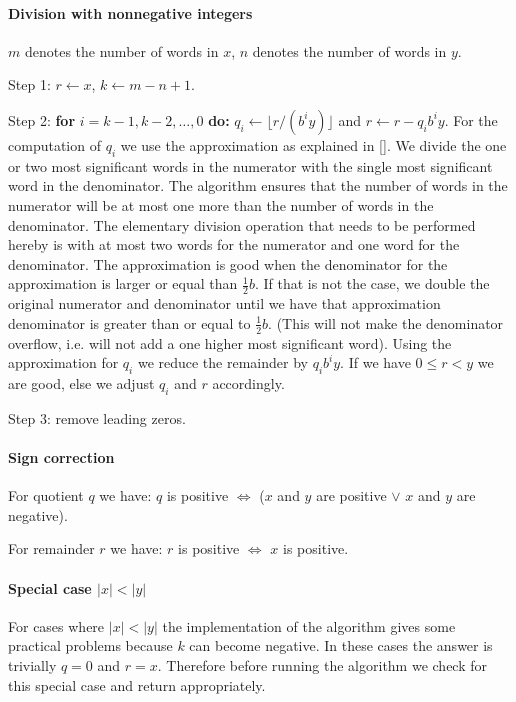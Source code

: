 \documentclass[a4paper]{article}
\begin{document}
\paragraph{Division with nonnegative integers}
$m$ denotes the number of words in $x$, $n$ denotes the number of words in $y$.

Step 1: $r \gets x$, $k \gets m - n + 1$.

Step 2: \textbf{for} $i = k-1, k-2, \ldots, 0$ \textbf{do:}
$q_i \gets \lfloor r / (b^i y) \rfloor$ and $r \gets r - q_i b^i y$.
For the computation of $q_i$ we use the approximation as explained in [\cite{ant}].
We divide the one or two most significant words in the numerator with the single most significant word in the denominator. The algorithm ensures that the number of words in the numerator will be at most one more than the number of words in the denominator.
The elementary division operation that needs to be performed hereby is with at most two words for the numerator and one word for the denominator.
The approximation is good when the denominator for the approximation is larger or equal than $\frac{1}{2} b$. If that is not the case, we double the original numerator and denominator until we have that approximation denominator is greater than or equal to $\frac{1}{2} b$. (This will not make the denominator overflow, i.e. will not add a one higher most significant word).
Using the approximation for $q_i$ we reduce the remainder by $q_i b^i y$.
If we have $0 \le r < y$ we are good, else we adjust $q_i$ and $r$ accordingly.

Step 3: remove leading zeros.


\paragraph{Sign correction}

For quotient $q$ we have: $q$ is positive $\iff$ ($x$ and $y$ are positive $\lor$ $x$ and $y$ are negative).

For remainder $r$ we have: $r$ is positive $\iff$ $x$ is positive.

\paragraph{Special case $|x|<|y|$}

For cases where $|x|<|y|$ the implementation of the algorithm gives some practical problems because $k$ can become negative.
In these cases the answer is trivially $q=0$ and $r=x$.
Therefore before running the algorithm we check for this special case and return appropriately.
\end{document}
